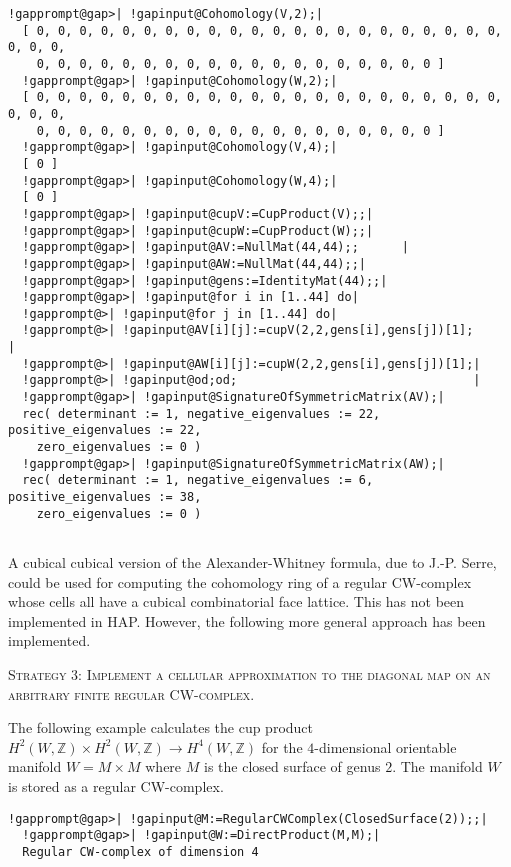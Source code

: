 \documentclass[a4paper,11pt]{report}
\begin{document}
{{\begin{Verbatim}[commandchars=!@|,fontsize=\small,frame=single,label=Example]
  !gapprompt@gap>| !gapinput@Cohomology(V,2);|
  [ 0, 0, 0, 0, 0, 0, 0, 0, 0, 0, 0, 0, 0, 0, 0, 0, 0, 0, 0, 0, 0, 0, 0, 0, 0, 
    0, 0, 0, 0, 0, 0, 0, 0, 0, 0, 0, 0, 0, 0, 0, 0, 0, 0, 0 ]
  !gapprompt@gap>| !gapinput@Cohomology(W,2);|
  [ 0, 0, 0, 0, 0, 0, 0, 0, 0, 0, 0, 0, 0, 0, 0, 0, 0, 0, 0, 0, 0, 0, 0, 0, 0, 
    0, 0, 0, 0, 0, 0, 0, 0, 0, 0, 0, 0, 0, 0, 0, 0, 0, 0, 0 ]
  !gapprompt@gap>| !gapinput@Cohomology(V,4);|
  [ 0 ]
  !gapprompt@gap>| !gapinput@Cohomology(W,4);|
  [ 0 ]
  !gapprompt@gap>| !gapinput@cupV:=CupProduct(V);;|
  !gapprompt@gap>| !gapinput@cupW:=CupProduct(W);;|
  !gapprompt@gap>| !gapinput@AV:=NullMat(44,44);;      |
  !gapprompt@gap>| !gapinput@AW:=NullMat(44,44);;|
  !gapprompt@gap>| !gapinput@gens:=IdentityMat(44);;|
  !gapprompt@gap>| !gapinput@for i in [1..44] do|
  !gapprompt@>| !gapinput@for j in [1..44] do|
  !gapprompt@>| !gapinput@AV[i][j]:=cupV(2,2,gens[i],gens[j])[1];                               |
  !gapprompt@>| !gapinput@AW[i][j]:=cupW(2,2,gens[i],gens[j])[1];|
  !gapprompt@>| !gapinput@od;od;                                 |
  !gapprompt@gap>| !gapinput@SignatureOfSymmetricMatrix(AV);|
  rec( determinant := 1, negative_eigenvalues := 22, positive_eigenvalues := 22,
    zero_eigenvalues := 0 )
  !gapprompt@gap>| !gapinput@SignatureOfSymmetricMatrix(AW);|
  rec( determinant := 1, negative_eigenvalues := 6, positive_eigenvalues := 38, 
    zero_eigenvalues := 0 )
  
\end{Verbatim}
 A cubical cubical version of the Alexander-Whitney formula, due to J.-P.
Serre, could be used for computing the cohomology ring of a regular CW-complex
whose cells all have a cubical combinatorial face lattice. This has not been
implemented in HAP. However, the following more general approach has been
implemented. 

\textsc{Strategy 3: Implement a cellular approximation to the diagonal map on an
arbitrary finite regular CW-complex.} 

The following example calculates the cup product $H^2(W,\mathbb Z)\times H^2(W,\mathbb Z) \rightarrow H^4(W,\mathbb Z)$ for the $4$-dimensional orientable manifold $W=M\times M$ where $M$ is the closed surface of genus $2$. The manifold $W$ is stored as a regular CW-complex. 
\begin{Verbatim}[commandchars=!@|,fontsize=\small,frame=single,label=Example]
  !gapprompt@gap>| !gapinput@M:=RegularCWComplex(ClosedSurface(2));;|
  !gapprompt@gap>| !gapinput@W:=DirectProduct(M,M);|
  Regular CW-complex of dimension 4
  

\end{Verbatim}}}
\end{document}
